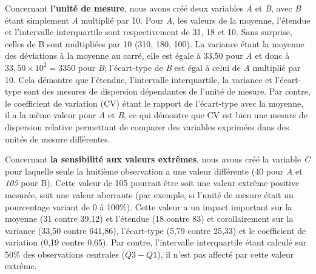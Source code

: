 \documentclass[
  11pt,
  french,
]{book}
\begin{document}
Concernant \textbf{l'unité de mesure}, nous avons créé deux variables \emph{A} et \emph{B}, avec \emph{B} étant simplement \emph{A} multiplié par 10. Pour \emph{A}, les valeurs de la moyenne, l'étendue et l'intervalle interquartile sont respectivement de 31, 18 et 10. Sans surprise, celles de B sont multipliées par 10 (310, 180, 100). La variance étant la moyenne des déviations à la moyenne au carré, elle est égale à 33,50 pour \emph{A} et donc à \(33,50\times10^2=3350\) pour \emph{B}; l'écart-type de \emph{B} est égal à celui de \emph{A} multiplié par 10. Cela démontre que l'étendue, l'intervalle interquartile, la variance et l'écart-type sont des mesures de dispersion dépendantes de l'unité de mesure. Par contre, le coefficient de variation (CV) étant le rapport de l'écart-type avec la moyenne, il a la même valeur pour \emph{A} et \emph{B}, ce qui démontre que CV est bien une mesure de dispersion relative permettant de comparer des variables exprimées dans des unités de mesure différentes.

Concernant \textbf{la sensibilité aux valeurs extrêmes}, nous avons créé la variable \emph{C} pour laquelle seule la huitième observation a une valeur différente (40 pour \emph{A} et \emph{105} pour B). Cette valeur de 105 pourrait être soit une valeur extrême positive mesurée, soit une valeur aberrante (par exemple, si l'unité de mesure était un pourcentage variant de 0 à 100\%). Cette valeur a un impact important sur la moyenne (31 contre 39,12) et l'étendue (18 contre 83) et corollairement sur la variance (33,50 contre 641,86), l'écart-type (5,79 contre 25,33) et le coefficient de variation (0,19 contre 0,65). Par contre, l'intervalle interquartile étant calculé sur 50\% des observations centrales (\(Q3-Q1\)), il n'est pas affecté par cette valeur extrême.
\end{document}
